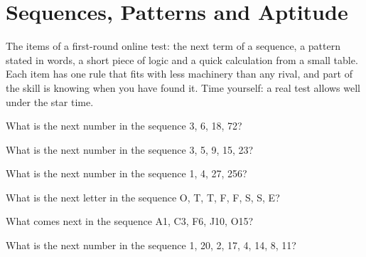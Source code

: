 \chapter{Sequences, Patterns and Aptitude}\label{ch:iv1:sequences-patterns-and-aptitude}

\begin{ivtrains}
The items of a first-round online test: the next term of a sequence, a pattern stated in words, a short piece of logic and a quick calculation from a small table. Each item has one rule that fits with less machinery than any rival, and part of the skill is knowing when you have found it. Time yourself: a real test allows well under the star time.
\end{ivtrains}

\begin{question}\label{iq:iv1:sequences-patterns-and-aptitude:1}
What is the next number in the sequence 3, 6, 18, 72?
\end{question}

\begin{question}\label{iq:iv1:sequences-patterns-and-aptitude:2}
What is the next number in the sequence 3, 5, 9, 15, 23?
\end{question}

\begin{question}\label{iq:iv1:sequences-patterns-and-aptitude:3}
What is the next number in the sequence 1, 4, 27, 256?
\end{question}

\begin{question}\label{iq:iv1:sequences-patterns-and-aptitude:4}
What is the next letter in the sequence O, T, T, F, F, S, S, E?
\end{question}

\begin{question}\label{iq:iv1:sequences-patterns-and-aptitude:5}
What comes next in the sequence A1, C3, F6, J10, O15?
\end{question}

\begin{question}\label{iq:iv1:sequences-patterns-and-aptitude:6}
What is the next number in the sequence 1, 20, 2, 17, 4, 14, 8, 11?
\end{question}


